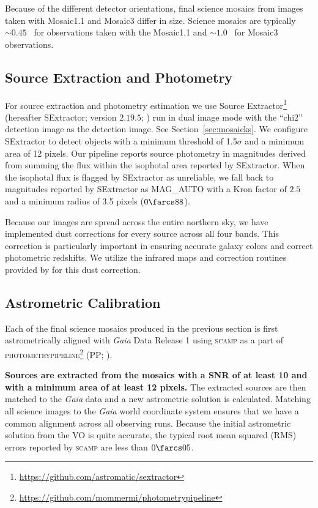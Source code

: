 \documentclass[apj, revtex4-1]{emulateapj}
\begin{document}
Because of the different detector orientations, final science mosaics from images taken with Mosaic1.1 and Mosaic3 differ in size. Science mosaics are typically $\sim0.45$ \degsq\ for observations taken with the Mosaic1.1 and $\sim1.0$ \degsq\ for Mosaic3 observations.

\subsection{Source Extraction and Photometry}\label{sec:sextractor}
For source extraction and photometry estimation we use Source Extractor\footnote{\url{https://github.com/astromatic/sextractor}} (hereafter SExtractor; version $2.19.5$; \citealt{Bertin1996}) run in dual image mode with the ``chi2'' detection image as the detection image. See Section~\ref{sec:mosaicks}. We configure SExtractor to detect objects with a minimum threshold of 1.5$\sigma$ and a minimum area of 12 pixels.
Our pipeline reports source photometry in magnitudes derived from summing the flux within the isophotal area reported by SExtractor. When the isophotal flux is flagged by SExtractor as unreliable, we fall back to magnitudes reported by SExtractor as \textsc{MAG\_AUTO} with a Kron factor \citep{Kron1980} of $2.5$ and a minimum radius of 3.5 pixels ($0\farcs88$).

Because our images are spread across the entire northern sky, we have implemented dust corrections for every source across all four bands. This correction is particularly important in ensuring accurate galaxy colors and correct photometric redshifts. We utilize the infrared maps and correction routines provided by \cite{Schlegel1998} for this dust correction.

\subsection{Astrometric Calibration}
Each of the final science mosaics produced in the previous section is first astrometrically aligned with \textit{Gaia} \citep{GaiaCollaboration2016} Data Release 1 \citep{GaiaCollaboration2016a} using \textsc{scamp} \citep{Bertin2006} as a part of \textsc{photometrypipeline}\footnote{\url{https://github.com/mommermi/photometrypipeline}} (PP; \citealt{Mommert2017}).

\textbf{Sources are extracted from the mosaics with a SNR of at least 10 and with a minimum area of at least 12 pixels.} The extracted sources are then matched to the \textit{Gaia} data and a new astrometric solution is calculated. Matching all science images to the \textit{Gaia} world coordinate system ensures that we have a common alignment across all observing runs. Because the initial astrometric solution from the VO is quite accurate, the
typical root mean squared (RMS) errors reported by \textsc{scamp} are less than $0\farcs05$.
\end{document}
